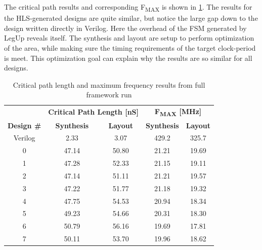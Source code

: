 The critical path results and corresponding F\textsubscript{MAX} is shown in \cref{tab:critpathfmax}. The results for the HLS-generated designs are quite similar, but notice the large gap down to the design written directly in Verilog. Here the overhead of the FSM generated by LegUp reveals itself. The synthesis and layout are setup to perform optimization of the area, while making sure the timing requirements of the target clock-period is meet. This optimization goal can explain why the results are so similar for all designs. 
\begin{table}[hbtp]
    \centering
    \begin{tabular}{c|cc|cc}
     \multicolumn{1}{c}{} & \multicolumn{2}{c}{\textbf{Critical Path Length [nS]}} & \multicolumn{2}{c}{\textbf{F\textsubscript{MAX} [MHz]}}\\
     \cline{2-5}
     \textbf{Design \#} & \textbf{Synthesis} & \textbf{Layout} & \textbf{Synthesis} & \textbf{Layout} \\
    \toprule
    Verilog & 2.33 & 3.07 & 429.2 & 325.7 \\
    0 & 47.14 & 50.80 & 21.21 & 19.69\\
    1 & 47.28 & 52.33 & 21.15 & 19.11\\
    2 & 47.14 & 51.11 & 21.21 & 19.57\\
    3 & 47.22 & 51.77 & 21.18 & 19.32\\
    4 & 47.75 & 54.53 & 20.94 & 18.34\\
    5 & 49.23 & 54.66 & 20.31 & 18.30\\
    6 & 50.79 & 56.16 & 19.69 & 17.81\\
    7 & 50.11 & 53.70 & 19.96 & 18.62\\
    \bottomrule
    \end{tabular}
    \caption{Critical path length and maximum frequency results from full framework run}
    \label{tab:critpathfmax}
\end{table}
       
